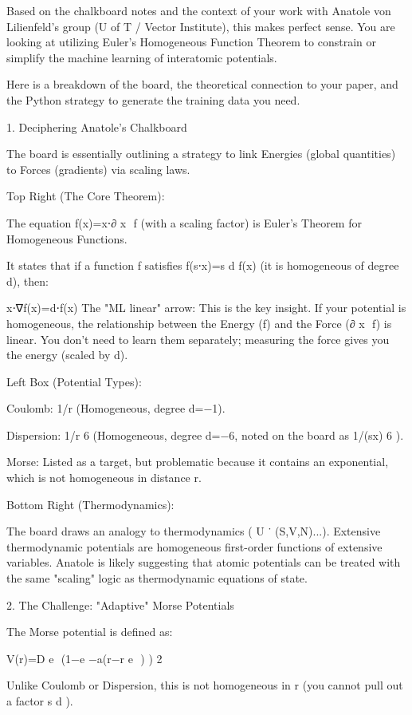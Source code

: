 Based on the chalkboard notes and the context of your work with Anatole von Lilienfeld's group (U of T / Vector Institute), this makes perfect sense. You are looking at utilizing Euler’s Homogeneous Function Theorem to constrain or simplify the machine learning of interatomic potentials.

Here is a breakdown of the board, the theoretical connection to your paper, and the Python strategy to generate the training data you need.

1. Deciphering Anatole’s Chalkboard

The board is essentially outlining a strategy to link Energies (global quantities) to Forces (gradients) via scaling laws.

Top Right (The Core Theorem):

The equation f(x)=x⋅∂ 
x
​	
 f (with a scaling factor) is Euler's Theorem for Homogeneous Functions.

It states that if a function f satisfies f(s⋅x)=s 
d
 f(x) (it is homogeneous of degree d), then:

x⋅∇f(x)=d⋅f(x)
The "ML linear" arrow: This is the key insight. If your potential is homogeneous, the relationship between the Energy (f) and the Force (∂ 
x
​	
 f) is linear. You don't need to learn them separately; measuring the force gives you the energy (scaled by d).

Left Box (Potential Types):

Coulomb: 1/r (Homogeneous, degree d=−1).

Dispersion: 1/r 
6
  (Homogeneous, degree d=−6, noted on the board as 1/(sx) 
6
 ).

Morse: Listed as a target, but problematic because it contains an exponential, which is not homogeneous in distance r.

Bottom Right (Thermodynamics):

The board draws an analogy to thermodynamics ( 
U
˙
 (S,V,N)...). Extensive thermodynamic potentials are homogeneous first-order functions of extensive variables. Anatole is likely suggesting that atomic potentials can be treated with the same "scaling" logic as thermodynamic equations of state.

2. The Challenge: "Adaptive" Morse Potentials

The Morse potential is defined as:

V(r)=D 
e
​	
 (1−e 
−a(r−r 
e
​	
 )
 ) 
2
 
Unlike Coulomb or Dispersion, this is not homogeneous in r (you cannot pull out a factor s 
d
 ).

